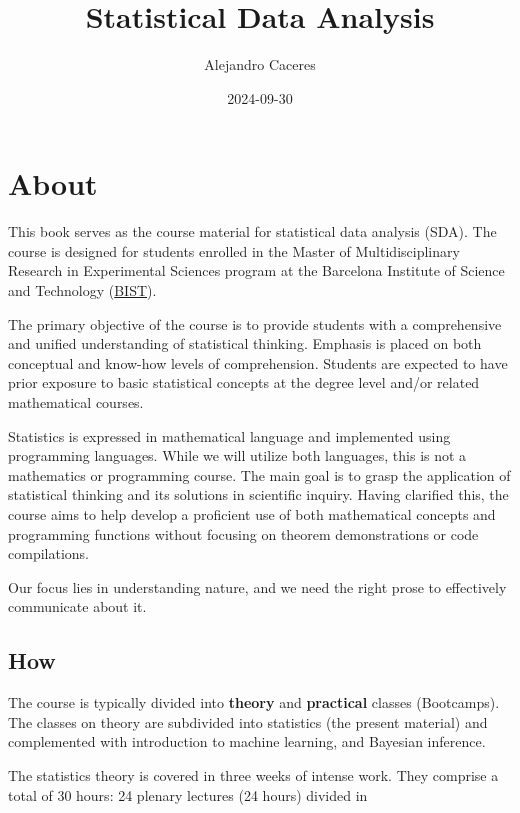 \documentclass[
]{book}
\title{Statistical Data Analysis}
\author{Alejandro Caceres}
\date{2024-09-30}
\begin{document}
\maketitle

{
\setcounter{tocdepth}{1}
\tableofcontents
}
\hypertarget{about}{%
\chapter{About}\label{about}}

This book serves as the course material for statistical data analysis (SDA). The course is designed for students enrolled in the Master of Multidisciplinary Research in Experimental Sciences program at the Barcelona Institute of Science and Technology (\href{https://bist.eu/}{BIST}).

The primary objective of the course is to provide students with a comprehensive and unified understanding of statistical thinking. Emphasis is placed on both conceptual and know-how levels of comprehension. Students are expected to have prior exposure to basic statistical concepts at the degree level and/or related mathematical courses.

Statistics is expressed in mathematical language and implemented using programming languages. While we will utilize both languages, this is not a mathematics or programming course. The main goal is to grasp the application of statistical thinking and its solutions in scientific inquiry. Having clarified this, the course aims to help develop a proficient use of both mathematical concepts and programming functions without focusing on theorem demonstrations or code compilations.

Our focus lies in understanding nature, and we need the right prose to effectively communicate about it.

\hypertarget{how}{%
\section{How}\label{how}}

The course is typically divided into \textbf{theory} and \textbf{practical} classes (Bootcamps). The classes on theory are subdivided into statistics (the present material) and complemented with introduction to machine learning, and Bayesian inference.

The statistics theory is covered in three weeks of intense work. They comprise a total of 30 hours: 24 plenary lectures (24 hours) divided in
\end{document}
